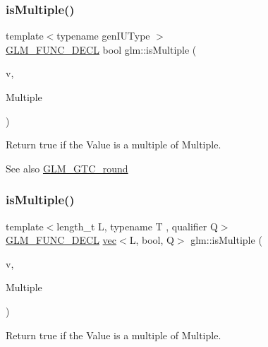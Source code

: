 \subsubsection{\texorpdfstring{is\+Multiple()}{isMultiple()}\hspace{0.1cm}{\footnotesize\ttfamily [1/3]}}
{\footnotesize\ttfamily template$<$typename gen\+I\+U\+Type $>$ \\
\mbox{\hyperlink{setup_8hpp_ab2d052de21a70539923e9bcbf6e83a51}{G\+L\+M\+\_\+\+F\+U\+N\+C\+\_\+\+D\+E\+CL}} bool glm\+::is\+Multiple (\begin{DoxyParamCaption}\item[{gen\+I\+U\+Type}]{v,  }\item[{gen\+I\+U\+Type}]{Multiple }\end{DoxyParamCaption})}

Return true if the \textquotesingle{}Value\textquotesingle{} is a multiple of \textquotesingle{}Multiple\textquotesingle{}.

\begin{DoxySeeAlso}{See also}
\mbox{\hyperlink{group__gtc__round}{G\+L\+M\+\_\+\+G\+T\+C\+\_\+round}} 
\end{DoxySeeAlso}
\mbox{\label{group__gtc__round_ga354caf634ef333d9cb4844407416256a}} 
\subsubsection{\texorpdfstring{is\+Multiple()}{isMultiple()}\hspace{0.1cm}{\footnotesize\ttfamily [2/3]}}
{\footnotesize\ttfamily template$<$length\+\_\+t L, typename T , qualifier Q$>$ \\
\mbox{\hyperlink{setup_8hpp_ab2d052de21a70539923e9bcbf6e83a51}{G\+L\+M\+\_\+\+F\+U\+N\+C\+\_\+\+D\+E\+CL}} \mbox{\hyperlink{structglm_1_1vec}{vec}}$<$L, bool, Q$>$ glm\+::is\+Multiple (\begin{DoxyParamCaption}\item[{\mbox{\hyperlink{structglm_1_1vec}{vec}}$<$ L, T, Q $>$ const \&}]{v,  }\item[{T}]{Multiple }\end{DoxyParamCaption})}

Return true if the \textquotesingle{}Value\textquotesingle{} is a multiple of \textquotesingle{}Multiple\textquotesingle{}.


